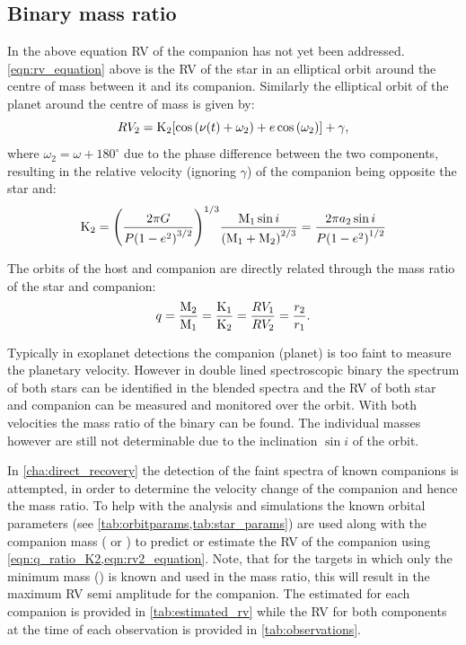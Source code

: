 \subsection{Binary mass ratio}
\label{subsec:binary_mass_ratio}
In the above equation RV of the companion has not yet been addressed.
\cref{eqn:rv_equation} above is the RV of the star in an elliptical orbit around the centre of mass between it and its companion. Similarly the elliptical orbit of the planet around the centre of mass is given by:
\begin{equation}
    {RV_{2}} = \textrm{K}_{2} [\cos{(\nu(t) + \omega_{2})} + e\cos{(\omega_{2})}] + \gamma, \label{eqn:rv2_equation}
\end{equation}
where \(\omega_{2} = \omega + 180^\circ\) due to the phase difference between the two components, resulting in the relative velocity (ignoring $\gamma$) of the companion being opposite the star and:
\begin{equation}
    \textrm{K}_{2}  = {\left(  \frac{2 \pi G}{P{(1 - {e}^{2})}^{3/2}} \right)}^{1/3} \frac{\textrm{M}_{1} \sin{i}}{{(\textrm{M}_{1} + \textrm{M}_{2})}^{2/3}} = \frac{2 \pi a_2 \sin{i}}{P{(1 - {e}^{2})}^{1/2}} \label{eqn:ktwo}
\end{equation}

The orbits of the host and companion are directly related through the mass ratio of the star and companion:
\begin{equation}
q = \frac{\textrm{M}_{2}}{\textrm{M}_{1}} = \frac{\textrm{K}_{1}}{\textrm{K}_{2}} = \frac{RV_{1}}{RV_{2}} = \frac{r_2}{r_1} \label{eqn:q_ratio_K2}.
\end{equation}

Typically in exoplanet detections the companion (planet) is too faint to measure the planetary velocity. However in double lined spectroscopic binary the spectrum of both stars can be identified in the blended spectra and the RV of both star and companion can be measured and monitored over the orbit. With both velocities the mass ratio of the binary can be found. The individual masses however are still not determinable due to the inclination $\sin{i}$ of the orbit.

In \cref{cha:direct_recovery} the detection of the faint spectra of known companions is attempted, in order to determine the velocity change of the companion and hence the mass ratio. To help with the analysis and simulations the known orbital parameters (see \cref{tab:orbitparams,tab:star_params}) are used along with the companion mass (\Mtwo{} or \Mtwosini{}) to predict or estimate the RV of the companion using \cref{eqn:q_ratio_K2,eqn:rv2_equation}.
Note, that for the targets in which only the minimum mass (\Mtwosini) is known and used in the mass ratio, this will result in the maximum {RV} semi amplitude for the companion.
The estimated \Ktwo{} for each companion is provided in \cref{tab:estimated_rv} while the {RV} for both components at the time of each observation is provided in \cref{tab:observations}.
